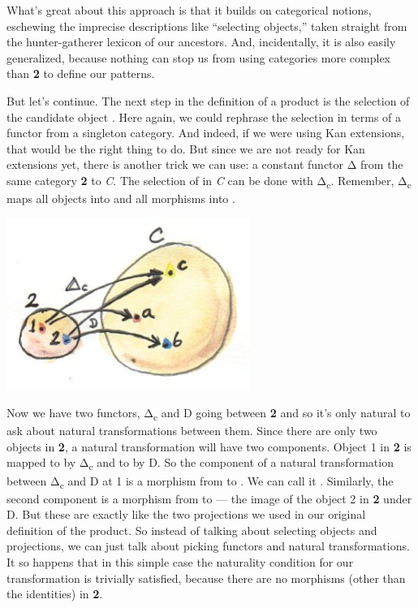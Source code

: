 What's great about this approach is that it builds on categorical
notions, eschewing the imprecise descriptions like ``selecting
objects,'' taken straight from the hunter-gatherer lexicon of our
ancestors. And, incidentally, it is also easily generalized, because
nothing can stop us from using categories more complex than \textbf{2}
to define our patterns.

But let's continue. The next step in the definition of a product is the
selection of the candidate object . Here again, we could
rephrase the selection in terms of a functor from a singleton category.
And indeed, if we were using Kan extensions, that would be the right
thing to do. But since we are not ready for Kan extensions yet, there is
another trick we can use: a constant functor Δ from the same category
\textbf{2} to \emph{C}. The selection of  in \emph{C} can be
done with Δ\textsubscript{c}. Remember, Δ\textsubscript{c} maps all
objects into  and all morphisms into .

\includegraphics[width=3.12500in]{images/twodelta.jpg}

Now we have two functors, Δ\textsubscript{c} and D going between
\textbf{2} and  so it's only natural to ask about natural
transformations between them. Since there are only two objects in
\textbf{2}, a natural transformation will have two components. Object 1
in \textbf{2} is mapped to  by Δ\textsubscript{c} and to
 by D. So the component of a natural transformation between
Δ\textsubscript{c} and D at 1 is a morphism from  to
. We can call it . Similarly, the second component
is a morphism  from  to  --- the image of
the object 2 in \textbf{2} under D. But these are exactly like the two
projections we used in our original definition of the product. So
instead of talking about selecting objects and projections, we can just
talk about picking functors and natural transformations. It so happens
that in this simple case the naturality condition for our transformation
is trivially satisfied, because there are no morphisms (other than the
identities) in \textbf{2}.

